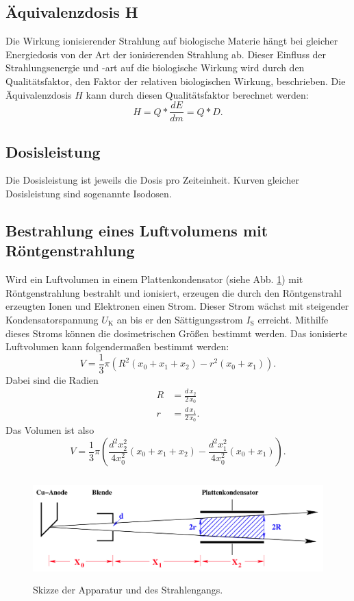 \subsection{Äquivalenzdosis H}
Die Wirkung ionisierender Strahlung auf biologische Materie
hängt bei gleicher Energiedosis von der Art der ionisierenden
Strahlung ab. Dieser Einfluss der Strahlungsenergie und -art
auf die biologische Wirkung wird durch den Qualitätsfaktor,
den Faktor der relativen biologischen Wirkung,
beschrieben.
Die Äquivalenzdosis $H$ kann durch diesen Qualitätsfaktor
berechnet werden:
\begin{equation*}
    H = Q * \frac{dE}{dm} = Q * D.
    \label{eqn:Aequivalenzdosis}
\end{equation*}

\subsection{Dosisleistung}
Die Dosisleistung ist jeweils die Dosis pro Zeiteinheit.
Kurven gleicher Dosisleistung sind sogenannte Isodosen.

\subsection{Bestrahlung eines Luftvolumens mit Röntgenstrahlung}
Wird ein Luftvolumen in einem Plattenkondensator
(siehe Abb. \ref{fig:Strahlgeometrie}) mit
Röntgenstrahlung bestrahlt und ionisiert, erzeugen die durch
den Röntgenstrahl erzeugten Ionen und Elektronen einen Strom.
Dieser Strom wächst mit steigender Kondensatorspannung 
$U_\text{K}$ an bis er den Sättigungsstrom $I_\text{S}$
erreicht. Mithilfe dieses Stroms können die dosimetrischen
Größen bestimmt werden.
\newline
Das ionisierte Luftvolumen kann folgendermaßen bestimmt werden:
\begin{equation*}
    V = \frac{1}{3} \pi (R^2 (x_0 + x_1 + x_2) - r^2 (x_0 + x_1)). 
\end{equation*}
Dabei sind die Radien
\begin{align*}
    R &= \frac{d \, x_2}{2 \, x_0} \\
    r &= \frac{d \, x_1}{2 \, x_0}. 
\end{align*}
Das Volumen ist also 
\begin{equation}
    V = \frac{1}{3} \pi \left(\frac{d^2 x_2^2}{4 x_0^2}(x_0 + x_1 + x_2) - \frac{d^2 x_1^2}{4 x_0^2}(x_0 + x_1)\right).
    \label{eqn:V}
\end{equation}

\begin{figure}
    \centering
    \includegraphics[width=12cm, height=4cm]{build/strahl.png}
    \caption{Skizze der Apparatur und des Strahlengangs. \cite{V607}}
    \label{fig:Strahlgeometrie}
\end{figure}
